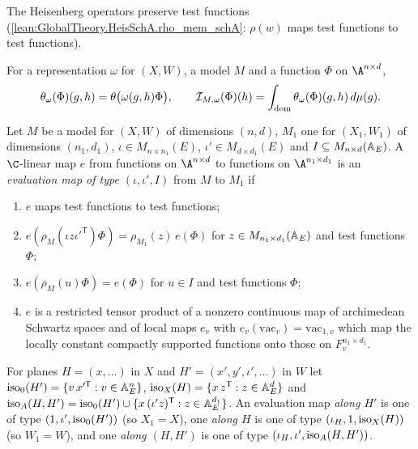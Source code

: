 The Heisenberg operators preserve test functions (\cref{lean:GlobalTheory.HeisSchA.rho_mem_schA}: $\rho(w)$ maps test
functions to test functions).

\begin{definition}\label{pf:thmK-cone:def-theta}
For a representation $\omega$ for $(X,W)$, a model $M$ and a function $\Phi$ on $\A^{n\times d}$,
\[
  \theta_\omega(\Phi)(g,h)=\theta\bigl(\omega(g,h)\Phi\bigr),\qquad
  \mathcal{I}_{M,\omega}(\Phi)(h)=\int_{\mathrm{dom}}\theta_\omega(\Phi)(g,h)\,d\mu(g).
\]
\end{definition}

\begin{definition}\label{pf:thmK-cone:def-ev}
Let $M$ be a model for $(X,W)$ of dimensions $(n,d)$, $M_1$ one for $(X_1,W_1)$ of dimensions $(n_1,d_1)$,
$\iota\in M_{n\times n_1}(E)$, $\iota'\in M_{d\times d_1}(E)$ and $I\subseteq M_{n\times d}(\mathbb{A}_E)$.  A $\C$-linear map
$e$ from functions on $\A^{n\times d}$ to functions on $\A^{n_1\times d_1}$ is an \emph{evaluation map of type
$(\iota,\iota',I)$} from $M$ to $M_1$ if
\begin{enumerate}[label=\textup{(E\arabic*)},ref=\textup{(E\arabic*)}]
\item\label{pf:thmK-cone:E1} $e$ maps test functions to test functions;
\item\label{pf:thmK-cone:E2} $e(\rho_M(\iota z\iota'^{\mathsf T})\Phi)=\rho_{M_1}(z)\,e(\Phi)$ for
  $z\in M_{n_1\times d_1}(\mathbb{A}_E)$ and test functions $\Phi$;
\item\label{pf:thmK-cone:E3} $e(\rho_M(u)\Phi)=e(\Phi)$ for $u\in I$ and test functions $\Phi$;
\item\label{pf:thmK-cone:E4} $e$ is a restricted tensor product of a nonzero continuous map of archimedean Schwartz spaces
  and of local maps $e_v$ with $e_v(\mathrm{vac}_v)=\mathrm{vac}_{1,v}$ which map the locally constant compactly supported
  functions onto those on $F_v^{n_1\times d_1}$.
\end{enumerate}
For planes $H=(x,\dots)$ in $X$ and $H'=(x',y',\iota',\dots)$ in $W$ let
$\operatorname{iso}_0(H')=\{v\,x'^{\mathsf T}:v\in\mathbb{A}_E^n\}$, $\operatorname{iso}_X(H)=\{x\,z^{\mathsf T}:z\in\mathbb{A}_E^d\}$ and
$\operatorname{iso}_A(H,H')=\operatorname{iso}_0(H')\cup\{x\,(\iota'z)^{\mathsf T}:z\in\mathbb{A}_E^{d_1}\}$.  An evaluation map
\emph{along $H'$} is one of type $(1,\iota',\operatorname{iso}_0(H'))$ (so $X_1=X$), one \emph{along $H$} is one of type
$(\iota_H,1,\operatorname{iso}_X(H))$ (so $W_1=W$), and one \emph{along $(H,H')$} is one of type
$(\iota_H,\iota',\operatorname{iso}_A(H,H'))$.
\end{definition}

